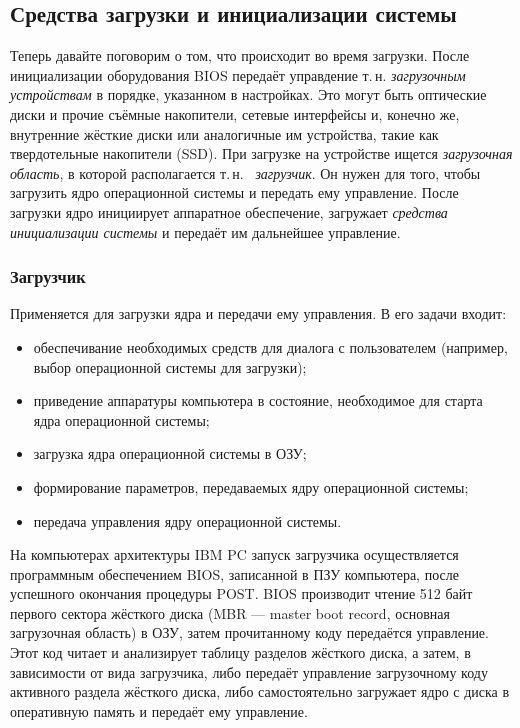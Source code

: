 \subsection{Средства загрузки и инициализации системы}\label{base:os:structure:bootandinit}
 Теперь давайте поговорим о том, что происходит во время загрузки. После инициализации оборудования BIOS передаёт управдение т.\,н. \emph{загрузочным устройствам} в порядке, указанном в настройках. Это могут быть оптические диски и прочие съёмные накопители, сетевые интерфейсы и, конечно же, внутренние жёсткие диски или аналогичные им устройства, такие как твердотельные накопители (SSD).
 При загрузке на устройстве ищется \emph{загрузочная область}, в которой располагается т.\,н.~ \emph{загрузчик}. Он нужен для того, чтобы загрузить ядро операционной системы и передать ему управление. После загрузки ядро инициирует аппаратное обеспечение, загружает \emph{средства инициализации системы} и передаёт им дальнейшее управление.
 
\subsubsection{Загрузчик}\label{base:os:structure:bootandinit:bootloader}
Применяется для загрузки ядра и передачи ему управления. В его задачи входит:
\begin{itemize}
 \item обеспечивание необходимых средств для диалога с пользователем (например, выбор операционной системы для загрузки);
 \item приведение аппаратуры компьютера в состояние, необходимое для старта ядра операционной системы;
 \item загрузка ядра операционной системы в ОЗУ;
 \item формирование параметров, передаваемых ядру операционной системы;
 \item передача управления ядру операционной системы.
\end{itemize}
 На компьютерах архитектуры IBM PC запуск загрузчика осуществляется программным обеспечением BIOS, записанной в ПЗУ компьютера, после успешного окончания процедуры POST. BIOS производит чтение 512 байт первого сектора жёсткого диска (MBR --- master boot record, основная загрузочная область) в ОЗУ, затем прочитанному коду передаётся управление.
 Этот код читает и анализирует таблицу разделов жёсткого диска, а затем, в зависимости от вида загрузчика, либо передаёт управление загрузочному коду активного раздела жёсткого диска, либо самостоятельно загружает ядро с диска в оперативную память и передаёт ему управление.
  
